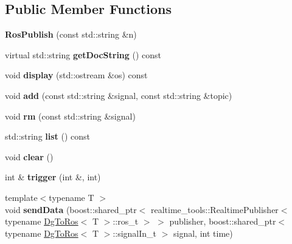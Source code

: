 \subsection*{Public Member Functions}
\begin{DoxyCompactItemize}
\item 
\mbox{\label{classdynamic__graph_1_1RosPublish_a096779c4bfebb42570b99522a0080cd7}} 
{\bfseries Ros\+Publish} (const std\+::string \&n)
\item 
\mbox{\label{classdynamic__graph_1_1RosPublish_aba5142e42bd9a109086429613e2b5b52}} 
virtual std\+::string {\bfseries get\+Doc\+String} () const
\item 
\mbox{\label{classdynamic__graph_1_1RosPublish_a73eed76bdaa4c6abbda4644c583b8597}} 
void {\bfseries display} (std\+::ostream \&os) const
\item 
\mbox{\label{classdynamic__graph_1_1RosPublish_ad0e751d0df273d7b35a39802cfd2e2f4}} 
void {\bfseries add} (const std\+::string \&signal, const std\+::string \&topic)
\item 
\mbox{\label{classdynamic__graph_1_1RosPublish_acfc49e5212dc48c7623b10d4b48be8ad}} 
void {\bfseries rm} (const std\+::string \&signal)
\item 
\mbox{\label{classdynamic__graph_1_1RosPublish_af39470c4b43776408f4675a5b9d946fc}} 
std\+::string {\bfseries list} () const
\item 
\mbox{\label{classdynamic__graph_1_1RosPublish_a3e6ddd8230db25e46874193b81f31715}} 
void {\bfseries clear} ()
\item 
\mbox{\label{classdynamic__graph_1_1RosPublish_aedf99adaa287e141875b3061c2699c64}} 
int \& {\bfseries trigger} (int \&, int)
\item 
\mbox{\label{classdynamic__graph_1_1RosPublish_a3d0602010171406c481116458ced5211}} 
{\footnotesize template$<$typename T $>$ }\\void {\bfseries send\+Data} (boost\+::shared\+\_\+ptr$<$ realtime\+\_\+tools\+::\+Realtime\+Publisher$<$ typename \hyperlink{classdynamic__graph_1_1DgToRos}{Dg\+To\+Ros}$<$ T $>$\+::ros\+\_\+t $>$ $>$ publisher, boost\+::shared\+\_\+ptr$<$ typename \hyperlink{classdynamic__graph_1_1DgToRos}{Dg\+To\+Ros}$<$ T $>$\+::signal\+In\+\_\+t $>$ signal, int time)

\end{DoxyCompactItemize}
